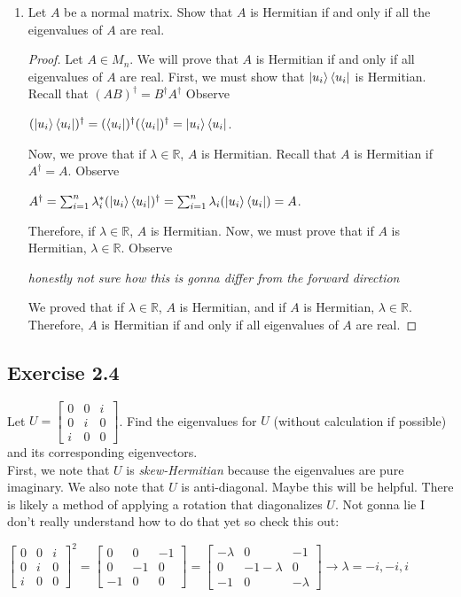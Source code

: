 \documentclass[12pt]{article}
\theoremstyle{plain}
\theoremstyle{nonumberplain}
\theoremstyle{plain}
\theoremstyle{nonumberplain}
\newtheorem{proof}{Proof.}
\newcommand\1{{\bf 1}}
\newcommand{\bmat}[1]{\begin{bmatrix*} #1 \end{bmatrix*}} %
\newcommand{\R}{\mathbb{R}} %
\newcommand{\<}{\left\langle}
\renewcommand{\>}{\right\rangle}
\begin{document}
\begin{enumerate}[label=(\alph*)]
\item Let $A$ be a normal matrix. Show that $A$ is Hermitian if and only if all the eigenvalues of $A$ are real.
\begin{proof}
Let $A\in M_n$. We will prove that $A$ is Hermitian if and only if all eigenvalues of $A$ are real. First, we must show that $\ket{u_i}\bra{u_i}$ is Hermitian. Recall that $(AB)^\dagger=B^\dagger A^\dagger$ Observe
\begin{center}
$(\ket{u_i}\bra{u_i})^\dagger=(\bra{u_i})^\dagger(\bra{u_i})^\dagger=\ket{u_i}\bra{u_i}$.
\end{center} 
Now, we prove that if $\lambda\in\R$, $A$ is Hermitian. Recall that $A$ is Hermitian if $A^\dagger=A$. Observe \\
\begin{center}
$A^\dagger=\sum^n_{i=1}\lambda_i^*(\ket{u_i}\bra{u_i})^\dagger=\sum^n_{i=1}\lambda_i(\ket{u_i}\bra{u_i})=A$.
\end{center}
Therefore, if $\lambda\in\R$, $A$ is Hermitian. Now, we must prove that if $A$ is Hermitian, $\lambda\in\R$. Observe
\begin{center}
\textit{honestly not sure how this is gonna differ from the forward direction}
\end{center}
We proved that if $\lambda\in\R$, $A$ is Hermitian, and if $A$ is Hermitian, $\lambda\in\R$. Therefore, $A$ is Hermitian if and only if all eigenvalues of $A$ are real.
\end{proof}
\end{enumerate}


\subsection{Exercise 2.4}
Let $U=\bmat{0 & 0 & i \\ 0 & i & 0 \\ i & 0 & 0}$. Find the eigenvalues for $U$ (without calculation if possible) and its corresponding eigenvectors. \\
First, we note that $U$ is \textit{skew-Hermitian} because the eigenvalues are pure imaginary. We also note that $U$ is anti-diagonal. Maybe this will be helpful. There is likely a method of applying a rotation that diagonalizes $U$. Not gonna lie I don't really understand how to do that yet so check this out:
\begin{center}
$\bmat{0 & 0 & i \\ 0 & i & 0 \\ i & 0 & 0}^2=\bmat{0 & 0 & -1 \\ 0 & -1 & 0 \\ -1 & 0 & 0}=
\bmat{-\lambda & 0 & -1 \\ 0 & -1-\lambda & 0 \\ -1 & 0 & -\lambda}\longrightarrow\lambda=-i,-i,i$
\end{center}
\end{document}

